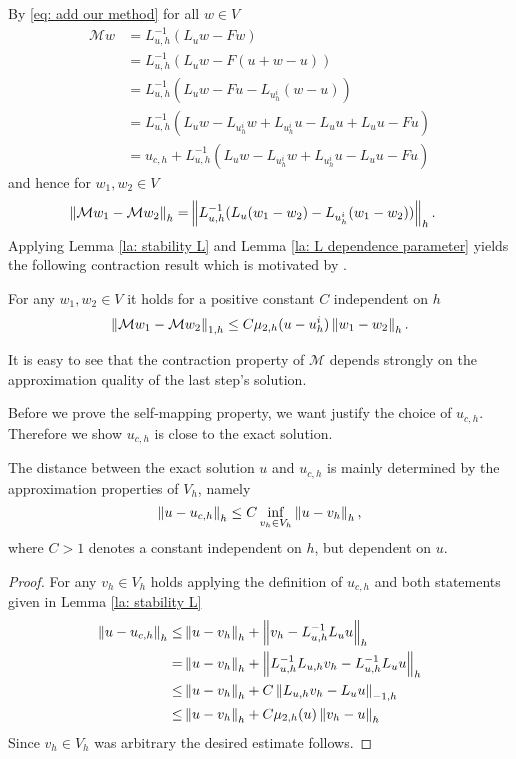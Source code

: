 By \eqref{eq: add our method} for all $w \in V$
\begin{align}
	\mathcal M w &= L_{u,h}^{-1}(L_u w - Fw) \nonumber\\
				 &= L_{u,h}^{-1}(L_u w - F(u+w-u)) \nonumber\\
				 &= L_{u,h}^{-1}(L_u w - Fu - L_{u^i_h} (w-u)) \nonumber\\
				 &=  L_{u,h}^{-1}(L_u w - L_{u^i_h} w + L_{u^i_h}u - L_u u + L_u u - Fu) \nonumber\\
				 & = u_{c,h} + L_{u,h}^{-1}(L_u w - L_{u^i_h} w + L_{u^i_h}u - L_u u - Fu) \label{eq: expand M}
 \end{align}
and hence for $w_1, w_2 \in V$
\begin{align*}
	\left\lVert \mathcal M w_1 - \mathcal M w_2 \right\rVert_{h} =& \left\lVert L_{u,h}^{-1}(L_u (w_1-w_2) - L_{u^i_h} (w_1-w_2)) \right\rVert_{h}.
\end{align*}
Applying Lemma \ref{la: stability L} and Lemma \ref{la: L dependence parameter} yields the following contraction result which is motivated by \cite[Lemma 3.4]{BGN+2011}.
\begin{lemma} \label{la: contraction property M}
	For any $w_1, w_2 \in V$ it holds for a positive constant $C$ independent on $h$
\begin{align*}
	\left\lVert \mathcal M w_1 - \mathcal M w_2 \right\rVert_{1,h}	\leq C \mu_{2,h}(u - u^i_h) \left\lVert w_1 - w_2 \right\rVert_{h}. \label{eq: estimate M}
\end{align*}
\end{lemma}
It is easy to see that the contraction property of $\mathcal{M}$ depends strongly on the approximation quality of the last step's solution. %

Before we prove the self-mapping property, we want justify the choice of $u_{c,h}$. Therefore we show $u_{c,h}$ is close to the exact \MA solution.

\begin{lemma}\label{la: difference u uch}
	The distance between the exact solution $u$ and $u_{c,h}$ is mainly determined by the approximation properties of $V_h$, namely
	\[
		\left\lVert u-u_{c,h} \right\rVert_{h} \leq C \inf_{v_h \in V_h} \left\lVert u-v_h \right\rVert_{h},
	\]
	where $C>1$ denotes a constant independent on $h$, but dependent on $u$.
\end{lemma}
\begin{proof}
	For any $v_h \in V_h$ holds applying the definition of $u_{c,h}$ and both statements given in Lemma \ref{la: stability L}
	\begin{align}
		\left\lVert u-u_{c,h} \right\rVert_{h} \leq& \left\lVert u- v_h \right\rVert_{h} + \left\lVert  v_h- L_{u,h}^{-1}L_u u \right\rVert_{h} \nonumber \\
			=& \left\lVert u- v_h \right\rVert_{h} + \left\lVert L_{u,h}^{-1}L_{u,h} v_h- L_{u,h}^{-1}L_u u \right\rVert_{h} \nonumber \\
			\leq& \left\lVert u- v_h \right\rVert_{h} + C \left\lVert L_{u,h} v_h-  L_u u \right\rVert_{-1,h} \nonumber \\
			\leq& \left\lVert u- v_h \right\rVert_{h} + C \mu_{2,h}(u)\left\lVert v_h -u \right\rVert_{h} \nonumber
	\end{align}
	Since $v_h \in V_h$ was arbitrary the desired estimate follows.
\end{proof}

